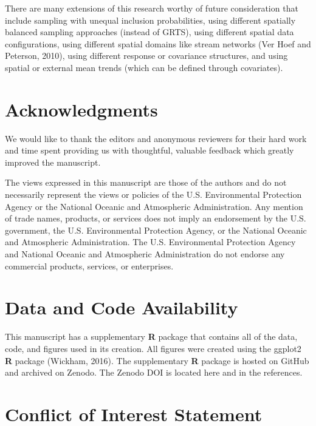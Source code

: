 \documentclass[]{elsarticle} %
\begin{document}
There are many extensions of this research worthy of future
consideration that include sampling with unequal inclusion
probabilities, using different spatially balanced sampling approaches
(instead of GRTS), using different spatial data configurations, using
different spatial domains like stream networks (Ver Hoef and Peterson,
2010), using different response or covariance structures, and using
spatial or external mean trends (which can be defined through
covariates).

\hypertarget{acknowledgments}{%
\section*{Acknowledgments}\label{acknowledgments}}

We would like to thank the editors and anonymous reviewers for their
hard work and time spent providing us with thoughtful, valuable feedback
which greatly improved the manuscript.

The views expressed in this manuscript are those of the authors and do
not necessarily represent the views or policies of the U.S.
Environmental Protection Agency or the National Oceanic and Atmospheric
Administration. Any mention of trade names, products, or services does
not imply an endorsement by the U.S. government, the U.S. Environmental
Protection Agency, or the National Oceanic and Atmospheric
Administration. The U.S. Environmental Protection Agency and National
Oceanic and Atmospheric Administration do not endorse any commercial
products, services, or enterprises.

\hypertarget{data-and-code-availability}{%
\section*{Data and Code Availability}\label{data-and-code-availability}}

This manuscript has a supplementary \textbf{\textsf{R}} package that
contains all of the data, code, and figures used in its creation. All
figures were created using the ggplot2 \textbf{\textsf{R}} package
(Wickham, 2016). The supplementary \textbf{\textsf{R}} package is hosted
on GitHub and archived on Zenodo. The Zenodo DOI is located here and in
the references.

\hypertarget{conflict-of-interest-statement}{%
\section*{Conflict of Interest
Statement}\label{conflict-of-interest-statement}}
\end{document}
